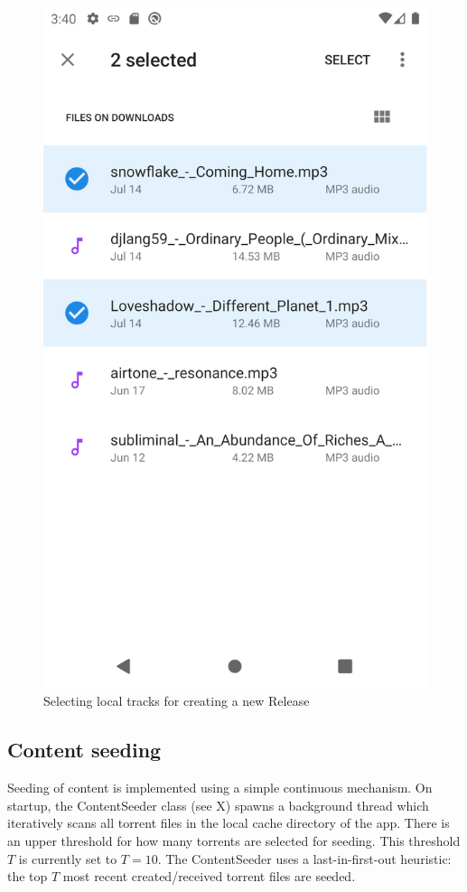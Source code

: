 \begin{figure}
        \includegraphics[width=\linewidth]{implementation/screenshot-submit-release.png}
        \caption{Selecting local tracks for creating a new Release}
        \label{fig:select-tracks}
    \endminipage\hfill
    \endminipage
\end{figure}
\subsection{Content seeding}
\label{sec:content-seeding}
Seeding of content is implemented using a simple continuous mechanism. On startup, the ContentSeeder class (see X) spawns a background thread which iteratively scans all torrent files in the local cache directory of the app. There is an upper threshold for how many torrents are selected for seeding. This threshold \(T\) is currently set to \(T=10\). The ContentSeeder uses a last-in-first-out heuristic: the top \(T\) most recent created/received torrent files are seeded.
